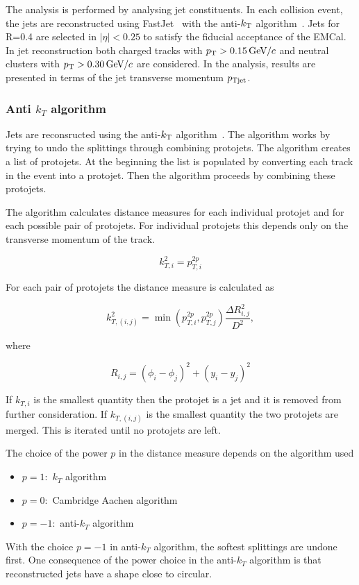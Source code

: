 The analysis is performed by analysing jet constituents. In each collision event, the jets are reconstructed using FastJet~\cite{fastjet} with the anti-$k_{\rm T}$ algorithm~\cite{antikt}. Jets for R=0.4 are selected in $\left| \eta \right| < 0.25 $ to satisfy the fiducial acceptance of the EMCal. In jet reconstruction both charged tracks with $p_{\rm T}>0.15\,\mathrm{GeV}\kern-0.05em/\kern-0.02em c$ and neutral clusters with $p_{\rm T}>0.30\,\mathrm{GeV}\kern-0.05em/\kern-0.02em c$ are considered. In the analysis, results are presented in terms of the jet transverse momentum $p_{\rm Tjet}$.

\subsubsection{Anti $k_T$ algorithm}
Jets are reconsructed using the anti-$k_{\rm T}$ algorithm~\cite{antikt}. The algorithm works by trying to undo the splittings through combining protojets. The algorithm creates a list of protojets. At the beginning the list is populated by converting each track in the event into a protojet. Then the algorithm proceeds by combining these protojets.

The algorithm calculates distance measures for each individual protojet and for each possible pair of protojets. For individual protojets this depends only on the transverse momentum of the track.

$$k_{T,i}^2=p_{T,i}^{2p}$$

For each pair of protojets the distance measure is calculated as

$$k_{T,\left(i,j\right)}^{2}=\min\left(p_{T,i}^{2p},p_{T,j}^{2p}\right)\frac{\Delta R^2_{i,j}}
{D^2},$$

where
 
 $$R_{i,j}=\left(\phi_i-\phi_j\right)^2+\left(y_i-y_j\right)^2$$

If $k_{T,i}$ is the smallest quantity then the protojet is a jet and it is removed from further consideration. If $k_{T,\left(i,j\right)}$ is the smallest quantity the two protojets are merged. This is iterated until no protojets are left.

The choice of the power $p$ in the distance measure depends on the algorithm used
\begin{itemize}
\item $p=1$:~$k_T$ algorithm
\item $p=0$:~Cambridge Aachen algorithm
\item $p=-1$:~anti-$k_T$ algorithm
\end{itemize}

With the choice $p=-1$ in anti-$k_T$ algorithm, the softest splittings are undone first. One consequence of the power choice in the anti-$k_T$ algorithm is that reconstructed jets have a shape close to circular.


